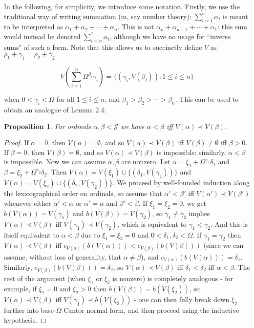 \documentclass{article}
\theoremstyle{definition}
\theoremstyle{plain}
\theoremstyle{plain}
\theoremstyle{plain}
\newtheorem{proposition}[definition]{Proposition}
\theoremstyle{plain}
\theoremstyle{remark}
\theoremstyle{remark}
\theoremstyle{remark}
\theoremstyle{plain}
\theoremstyle{plain}
\begin{document}
In the following, for simplicity, we introduce some notation. Firstly, we use the traditional way of writing summation (in, say number theory): $\sum_{i = 1}^n \alpha_i$ is meant to be interpreted as $\alpha_1 + \alpha_2 + \cdots + \alpha_n$. This is not $\alpha_n + \alpha_{n-1} + \cdots + \alpha_1$: this sum would instead be denoted $\sum_{i = n}^1 \alpha_i$, although we have no usage for ``inverse sums" of such a form. Note that this allows us to succinctly define $V$ as$\rho_1 + \gamma_1 = \rho_2 + \gamma_2$

\begin{equation}
V\left(\sum_{i = 1}^n \Omega^{\beta_i} \gamma_i\right) = \{(\gamma_i, V(\beta_i)): 1 \leq i \leq n\}
\end{equation}

when $0 < \gamma_i < \Omega$ for all $1 \leq i \leq n$, and $\beta_1 > \beta_2 > \cdots > \beta_n$. This can be used to obtain an analogue of Lemma 2.4:

\begin{proposition}
For ordinals $\alpha, \beta < \mathcal{J}$ we have $\alpha < \beta$ iff $V(\alpha) \prec V(\beta)$.
\end{proposition}

\begin{proof}
If $\alpha = 0$, then $V(\alpha) = \emptyset$, and so $V(\alpha) \prec V(\beta)$ iff $V(\beta) \neq \emptyset$ iff $\beta > 0$. If $\beta = 0$, then $V(\beta) = \emptyset$, and so $V(\alpha) \prec V(\beta)$ is impossible: similarly, $\alpha < \beta$ is impossible. Now we can assume $\alpha, \beta$ are nonzero. Let $\alpha = \xi_1 + \Omega^{\gamma_1} \delta_1$ and $\beta = \xi_2 + \Omega^{\gamma_2} \delta_2$. Then $V(\alpha) = V(\xi_1) \cup \{(\delta_1, V(\gamma_1))\}$ and $V(\alpha) = V(\xi_2) \cup \{(\delta_2, V(\gamma_2))\}$. We proceed by well-founded induction along the lexicographical order on ordinals, so assume that $\alpha' < \beta'$ iff $V(\alpha') \prec V(\beta')$ whenever either $\alpha' < \alpha$ or $\alpha' = \alpha$ and $\beta' < \beta$. If $\xi_1 = \xi_2 = 0$, we get $b(V(\alpha)) = V(\gamma_1)$ and $b(V(\beta)) = V(\gamma_2)$, so $\gamma_1 \neq \gamma_2$ implies $V(\alpha) \prec V(\beta)$ iff $V(\gamma_1) \prec V(\gamma_2)$, which is equivalent to $\gamma_1 < \gamma_2$. And this is itself equivalent to $\alpha < \beta$ due to $\xi_1 = \xi_2 = 0$ and $0 < \delta_1, \delta_2 < \Omega$. If $\gamma_1 = \gamma_2$ then $V(\alpha) \prec V(\beta)$ iff $c_{V(\alpha)}(b(V(\alpha))) < c_{V(\beta)}(b(V(\beta)))$ (since we can assume, without loss of generality, that $\alpha \neq \beta$), and $c_{V(\alpha)}(b(V(\alpha))) = \delta_1$. Similarly, $c_{V(\beta)}(b(V(\beta))) = \delta_2$, so $V(\alpha) \prec V(\beta)$ iff $\delta_1 < \delta_2$ iff $\alpha < \beta$. The rest of the argument (when $\xi_1$ or $\xi_2$ is nonzero) is completely analogous - for example, if $\xi_1 = 0$ and $\xi_2 > 0$ then  $b(V(\beta)) = b(V(\xi_2))$, so $V(\alpha) \prec V(\beta)$ iff $V(\gamma_1) \prec b(V(\xi_2))$ - one can then fully break down $\xi_2$ further into base-$\Omega$ Cantor normal form, and then proceed using the inductive hypothesis.
\end{proof}
\end{document}
